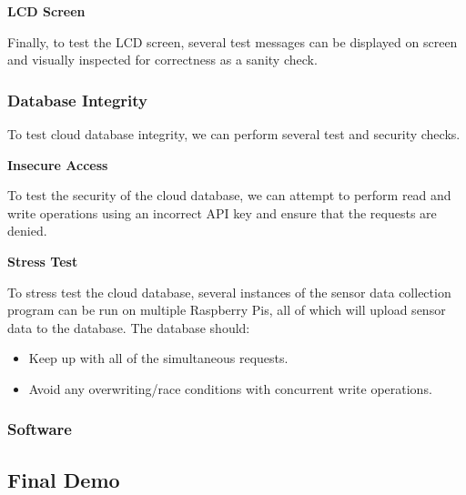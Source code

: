 \textbf{LCD Screen}

Finally, to test the LCD screen, several test messages can be displayed on screen and visually inspected for
correctness as a sanity check.

\subsubsection{Database Integrity}

To test cloud database integrity, we can perform several test and security checks.

\textbf{Insecure Access}

To test the security of the cloud database, we can attempt to perform read and write operations using an incorrect API
key and ensure that the requests are denied.

\textbf{Stress Test}

To stress test the cloud database, several instances of the sensor data collection program can be run on multiple
Raspberry Pis, all of which will upload sensor data to the database. The database should:

\begin{itemize}
    \item Keep up with all of the simultaneous requests.
    \item Avoid any overwriting/race conditions with concurrent write operations.
\end{itemize}

\subsubsection{Software}


\subsection{Final Demo}

